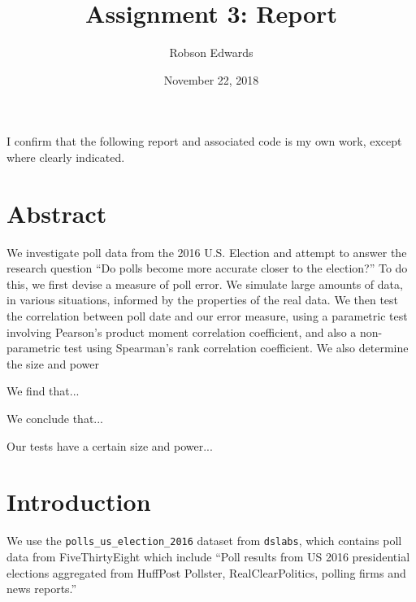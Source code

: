 \documentclass[11pt, oneside]{article}
\title{Assignment 3: Report}
\author{Robson Edwards}
\date{November 22, 2018}
\newcommand \Rcode[1]{{\texttt{\colorbox{codegray}{#1}}}}
\begin{document}
\maketitle

I confirm that the following report and associated code is my own work, except where clearly indicated.


\section*{Abstract}

We investigate poll data from the 2016 U.S. Election and attempt to answer the research question ``Do polls become more accurate closer to the election?'' 
To do this, we first devise a measure of poll error. 
We simulate large amounts of data, in various situations, informed by the properties of the real data. 
We then test the correlation between poll date and our error measure, using a parametric test involving Pearson's product moment correlation coefficient, and also a non-parametric test using Spearman's rank correlation coefficient. \cite{R}
We also determine the size and power 

We find that... %

We conclude that... %

Our tests have a certain size and power... %

\section{Introduction}

We use the \Rcode{polls\_us\_election\_2016} dataset from \Rcode{dslabs}, which contains poll data from FiveThirtyEight which include ``Poll results from US 2016 presidential elections aggregated from HuffPost Pollster, RealClearPolitics, polling firms and news reports.'' \cite{dslabs}

\end{document}
